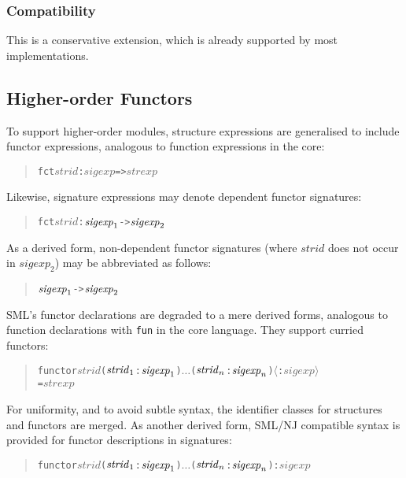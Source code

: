 \documentclass[twoside,titlepage]{article}
\begin{document}
\begin{appendix}
\subsubsection*{Compatibility}

This is a conservative extension, which is already supported by most implementations.


\subsection{Higher-order Functors}
\label{ext-higherfunctors}

To support higher-order modules, structure expressions are generalised to include functor expressions, analogous to function expressions in the core:
\begin{quote}
\begin{alltt}
fct \(\mathit{strid}\) : \(\mathit{sigexp}\) => \(\mathit{strexp}\)
\end{alltt}
\end{quote}
Likewise, signature expressions may denote dependent functor signatures:
\begin{quote}
\begin{alltt}
fct \(\mathit{strid}\) : \(\mathit{sigexp}\sb1\) -> \(\mathit{sigexp}\sb2\)
\end{alltt}
\end{quote}
As a derived form, non-dependent functor signatures (where $\mathit{strid}$ does not occur in $\mathit{sigexp}_2$) may be abbreviated as follows:
\begin{quote}
\begin{alltt}
\(\mathit{sigexp}\sb1\) -> \(\mathit{sigexp}\sb2\)
\end{alltt}
\end{quote}
SML's functor declarations are degraded to a mere derived forms, analogous to function declarations with {\tt fun} in the core language. They support curried functors:
\begin{quote}
\begin{alltt}
functor \(\mathit{strid}\) (\(\mathit{strid}\sb1\) : \(\mathit{sigexp}\sb1\)) \(\dots\) (\(\mathit{strid}\sb{n}\) : \(\mathit{sigexp}\sb{n}\)) \(\langle\): \(\mathit{sigexp}\rangle\)
           = \(\mathit{strexp}\)
\end{alltt}
\end{quote}
For uniformity, and to avoid subtle syntax, the identifier classes for structures and functors are merged.
As another derived form, SML/NJ compatible syntax is provided for functor descriptions in signatures:
\begin{quote}
\begin{alltt}
functor \(\mathit{strid}\) (\(\mathit{strid}\sb1\) : \(\mathit{sigexp}\sb1\)) \(\dots\) (\(\mathit{strid}\sb{n}\) : \(\mathit{sigexp}\sb{n}\)) : \(\mathit{sigexp}\)
\end{alltt}
\end{quote}


\end{appendix}
\end{document}
